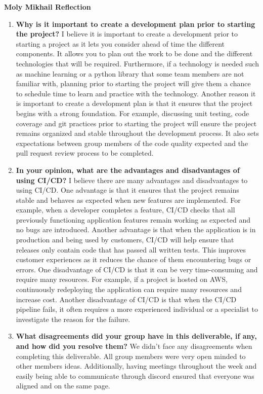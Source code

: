 \documentclass{article}
\begin{document}
\textbf{Moly Mikhail Reflection}
\begin{enumerate}
    \item  \textbf{Why is it important to create a development plan prior to starting the
    project?} \newline
    I believe it is important to create a development prior to starting a project as it lets you consider ahead of time the different 
    components. It allows you to plan out the work to be done and the different technologies that will be required. Furthermore, if a technology 
    is needed such as machine learning or a python library that some team members are not familiar with, planning prior to starting the project will give
    them a chance to schedule time to learn and practice with the technology. Another reason it is important to create a development plan is that it ensures that the project begins with a strong foundation.
    For example, discussing unit testing, code coverage and git practices prior to starting the project will ensure the project remains organized and stable throughout the development process. It also sets 
    expectations between group members of the code quality expected and the pull request review process to be completed.
    
    \item \textbf{In your opinion, what are the advantages and disadvantages of using
    CI/CD?} \newline
    I believe there are many advantages and disadvantages to using CI/CD. One advantage is that it ensures that the project remains stable and behaves as expected when new features are implemented. 
    For example, when a developer completes a feature, CI/CD checks that all previously functioning application features remain working as expected and no bugs are introduced. Another advantage
    is that when the application is in production and being used by customers, CI/CD will help ensure that releases only contain code that has passed all written tests.  This improves customer experiences
    as it reduces the chance of them encountering bugs or errors.  
    One disadvantage of CI/CD is that it can be very time-consuming and require many resources. For example, if a project is hosted on AWS, continuously redeploying the application
    can require many resources and increase cost. Another disadvantage of CI/CD is that when the CI/CD pipeline fails, it often requires a more 
    experienced individual or a specialist to investigate the reason for the failure.

    \item \textbf{What disagreements did your group have in this deliverable, if any,
    and how did you resolve them?}\newline
    We didn't face any disagreements when completing this deliverable. All group members were very open minded to other members ideas. Additionally, having meetings throughout the week and easily being able to communicate through discord ensured that everyone was aligned and on the same page. 

\end{enumerate}
\end{document}
